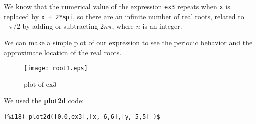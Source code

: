 \documentclass[12pt]{article}
\begin{document}
We know that the numerical value of the expression \verb|ex3| repeats when \verb|x| is
  replaced by \verb|x + 2*%pi|, so there are an infinite number of real roots, 
  related to $-\pi/2$ by adding or subtracting $2 n \pi$, where $n$ is an integer.

We can make a simple plot of our expression to see the periodic behavior and the
  approximate location of the real roots.
  
\smallskip
\begin{figure} [h]
   \centerline{\texttt{[image: root1.eps]} }
	\caption{plot of ex3}
\end{figure}
  
We used the \textbf{plot2d} code:
\small
\begin{verbatim}
(%i18) plot2d([0.0,ex3],[x,-6,6],[y,-5,5] )$
\end{verbatim}
\normalsize
\end{document}
